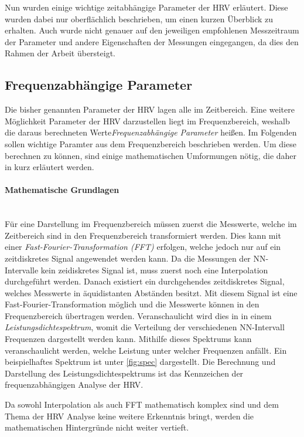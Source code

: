 Nun wurden einige wichtige zeitabhängige Parameter der HRV erläutert. Diese wurden dabei nur oberflächlich beschrieben, um einen kurzen Überblick zu erhalten. Auch wurde nicht genauer auf den jeweiligen empfohlenen Messzeitraum der Parameter und andere Eigenschaften der Messungen eingegangen, da dies den Rahmen der Arbeit übersteigt. 
 
\subsection{Frequenzabhängige Parameter}	

 Die bisher genannten Parameter der HRV lagen alle im Zeitbereich. Eine weitere Möglichkeit Parameter der HRV darzustellen liegt im Frequenzbereich, weshalb die daraus berechneten Werte\textit{Frequenzabhängige Parameter} heißen. Im Folgenden sollen wichtige Paramter aus dem Frequenzbereich beschrieben werden. Um diese berechnen zu können, sind einige mathematischen Umformungen nötig, die daher in kurz erläutert werden.
 
 \paragraph{Mathematische Grundlagen}\mbox{} \\
 \color{red}
 Für eine Darstellung im Frequenzbereich müssen zuerst die Messwerte, welche im Zeitbereich sind in den Frequenzbereich transformiert werden. Dies kann mit einer \textit{Fast-Fourier-Transformation (FFT)} erfolgen, welche jedoch nur auf ein zeitdiskretes Signal angewendet werden kann. Da die Messungen der NN-Intervalle kein zeidiskretes Signal ist, muss zuerst noch eine Interpolation durchgeführt werden. Danach existiert ein durchgehendes zeitdiskretes Signal, welches Messwerte in äquidistanten Abständen besitzt. Mit diesem Signal ist eine Fast-Fourier-Transformation möglich und die Messwerte können in den Frequenzbereich übertragen werden. Veranschaulicht wird dies in in einem \textit{Leistungsdichtespektrum}, womit die Verteilung der verschiedenen NN-Intervall Frequenzen dargestellt werden kann. Mithilfe dieses Spektrums kann veranschaulicht werden, welche Leistung unter welcher Frequenzen anfällt. Ein beispielhaftes Spektrum ist unter \ref{fig:spec} dargestellt. Die Berechnung und Darstellung des Leistungsdichtespektrums ist das Kennzeichen der frequenzabhängigen Analyse der HRV.

 Da sowohl Interpolation als auch FFT mathematisch komplex sind und dem Thema der HRV Analyse keine weitere Erkenntnis bringt, werden die mathematischen Hintergründe nicht weiter vertieft.\\\color{black}
 
